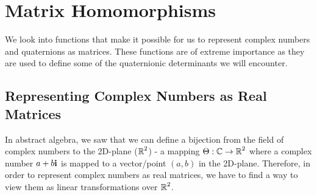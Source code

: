 \section{Matrix Homomorphisms}

We look into functions that make it possible for us to represent complex numbers and quaternions as matrices. These functions are of extreme importance as they are used to define some of the quaternionic determinants we will encounter.

\subsection{Representing Complex Numbers as Real Matrices}

In abstract algebra, we saw that we can define a bijection from the field of complex numbers to the 2D-plane ($\operatorname{\mathbb{R}}^2$) - a mapping $\Theta : \operatorname{\mathbb{C}} \rightarrow \operatorname{\mathbb{R}}^2$ where a complex number $a+b\textbf{i}$ is mapped to a vector/point $(a,b)$ in the 2D-plane. Therefore, in order to represent complex numbers as real matrices, we have to find a way to view them as linear transformations over $\operatorname{\mathbb{R}}^2$. 

